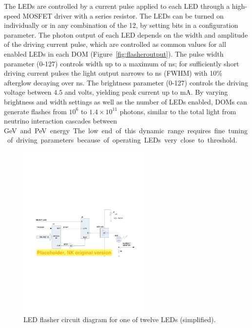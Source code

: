 The LEDs are controlled by a current pulse applied to each LED through
a high-speed MOSFET driver with a series resistor. The LEDs can be turned on individually or in any
combination of the 12, by setting bits in a configuration parameter.
The photon output of each LED depends on the width and
amplitude of the driving current pulse, which are controlled as common
values for all enabled LEDs in each DOM (Figure~\ref{fig:flasheroutput}).  
The pulse width parameter (0-127) controls width up to a maximum of \unit[70]{ns}; 
for sufficiently short driving current pulses the light output narrows to \unit[6]{ns} (FWHM) with
10\% afterglow decaying over \unit[15--20]{ns}.
The brightness parameter (0-127) controls the driving voltage between $4.5$ and \unit[15]{volts}, yielding
peak current up to \unit[300]{mA}.
By varying brightness and width settings as well as the number of LEDs enabled, DOMs can generate flashes
from $10^6$ to $1.4\times10^{11}$ photons, similar to the total light from
neutrino interaction cascades between \unit[7]GeV and \unit[1]PeV energy.
The low end of this dynamic range requires fine tuning of driving parameters because of
operating LEDs very close to threshold.

\begin{figure}[h]
 \centering
 \includegraphics[width=0.6\textwidth]{graphics/dom/functional/domfig4-FlasherDiagram.pdf}
 \caption{LED flasher circuit diagram for one of twelve LEDs (simplified).}
 \label{fig:flasherdiagram}
\end{figure}

